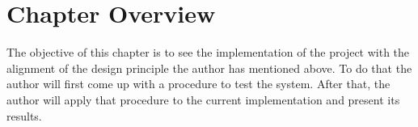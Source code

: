 \section{Chapter Overview}


The objective of this chapter is to see the implementation of the project with the alignment of the design principle the author has mentioned above. To do that the author will first come up with a procedure to test the system. After that, the author will apply that procedure to the current implementation and present its results.